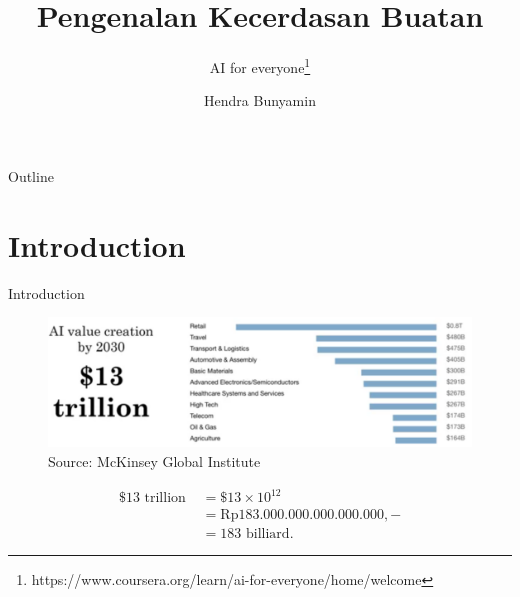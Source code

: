 \documentclass[pdf]{beamer}
\title[AI untuk Semua] %
{\textbf{Pengenalan Kecerdasan Buatan}}
\subtitle
{AI for everyone\footnote{https://www.coursera.org/learn/ai-for-everyone/home/welcome}}
\author[Hendra Bunyamin] %
{Hendra Bunyamin}
\institute[ ] %
{
  Program Studi Teknik Informatika\\
  Fakultas Teknologi Informasi\\
  Universitas Kristen Maranatha
}
\theoremstyle{mystyle}
\begin{document}
\begin{frame}
  \titlepage
\end{frame}

\begin{frame}{Outline}
  \tableofcontents
\end{frame}






\section{Introduction}
\begin{frame}{Introduction}
	\begin{figure}[!ht]
		\centering
		\includegraphics[scale=.225]{AI-value-creation}
		\caption{Source: McKinsey Global Institute~\citep{ng2019AIForEveryone}}
		\label{fig:ai-value-creation}
	\end{figure}
	\begin{align*}
	\$13 \text{ trillion } &= \$13 \times 10^{12} \\
	                       &= \text{Rp}183.000.000.000.000.000,- \\
                           &= 183 \text{ billiard}.	                       	
	\end{align*}	  
\end{frame}
\end{document}
